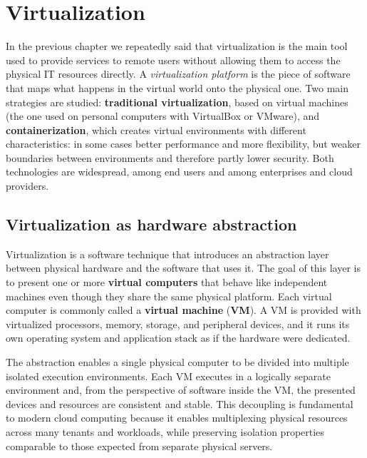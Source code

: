 \chapter{Virtualization}

In the previous chapter we repeatedly said that virtualization is the main tool used to provide services to remote users without allowing them to access the physical IT resources directly. A \emph{virtualization platform} is the piece of software that maps what happens in the virtual world onto the physical one. Two main strategies are studied: \textbf{traditional virtualization}, based on virtual machines (the one used on personal computers with VirtualBox or VMware), and \textbf{containerization}, which creates virtual environments with different characteristics: in some cases better performance and more flexibility, but weaker boundaries between environments and therefore partly lower security. Both technologies are widespread, among end users and among enterprises and cloud providers.

\section{Virtualization as hardware abstraction}

Virtualization is a software technique that introduces an abstraction layer between physical hardware and the software that uses it. The goal of this layer is to present one or more \textbf{virtual computers} that behave like independent machines even though they share the same physical platform. Each virtual computer is commonly called a \textbf{virtual machine} (\textbf{VM}). A VM is provided with virtualized processors, memory, storage, and peripheral devices, and it runs its own operating system and application stack as if the hardware were dedicated.

The abstraction enables a single physical computer to be divided into multiple isolated execution environments. Each VM executes in a logically separate environment and, from the perspective of software inside the VM, the presented devices and resources are consistent and stable. This decoupling is fundamental to modern cloud computing because it enables multiplexing physical resources across many tenants and workloads, while preserving isolation properties comparable to those expected from separate physical servers.

